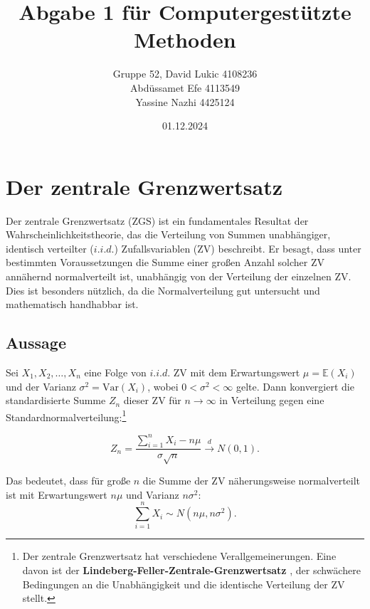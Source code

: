 \documentclass{article}
\title{Abgabe 1 für Computergestützte Methoden}
\author{Gruppe 52, David Lukic 4108236\\
                Abdüssamet Efe 4113549\\ Yassine Nazhi 4425124}
\date{01.12.2024}
\begin{document}
\maketitle

\tableofcontents

\newpage

\section{Der zentrale Grenzwertsatz}

Der zentrale Grenzwertsatz (ZGS) ist ein fundamentales Resultat der Wahrscheinlichkeitstheorie, das die Verteilung von Summen unabhängiger, identisch verteilter ($i.i.d.$) Zufallsvariablen (ZV) beschreibt. Er besagt, dass unter bestimmten Voraussetzungen die Summe einer großen Anzahl solcher ZV annähernd normalverteilt ist, unabhängig von der Verteilung der einzelnen ZV.  Dies ist besonders nützlich, da die Normalverteilung gut untersucht und mathematisch handhabbar ist.


\subsection{Aussage}

Sei $X_1, X_2, \ldots, X_n$ eine Folge von $i.i.d.$ ZV mit dem Erwartungswert $\mu = \mathbb{E}(X_i)$ und der Varianz $\sigma^2 = \mathrm{Var}(X_i)$, wobei $0 < \sigma^2 < \infty$ gelte. Dann konvergiert die standardisierte Summe $Z_n$ dieser ZV für $n \to \infty$ in Verteilung gegen eine Standardnormalverteilung:\footnote{Der zentrale Grenzwertsatz hat verschiedene Verallgemeinerungen. Eine davon ist der \textbf{Lindeberg-Feller-Zentrale-Grenzwertsatz} \cite[Seite 328]{klenke2013}, der schwächere Bedingungen an die Unabhängigkeit und die identische Verteilung der ZV stellt.}

\begin{equation}
Z_n = \frac{\sum_{i=1}^n X_i - n\mu}{\sigma \sqrt{n}} \xrightarrow{d} N(0,1). \label{Konvergenz}
\end{equation}

Das bedeutet, dass für große $n$ die Summe der ZV näherungsweise normalverteilt ist mit Erwartungswert $n\mu$ und Varianz $n\sigma^2$:
\begin{equation}
\sum_{i=1}^n X_i \sim N(n\mu, n\sigma^2). \label{Näherung}
\end{equation}
\end{document}
